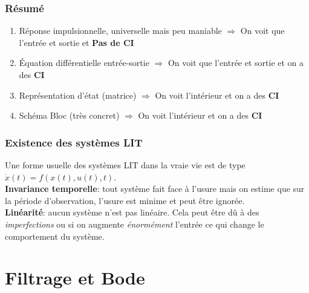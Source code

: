 \documentclass{report}
\begin{document}
\subsection{Résumé}
\begin{enumerate}
\item Réponse impulsionnelle, universelle mais peu maniable $\Rightarrow$ On voit que l'entrée et sortie et \textbf{Pas de CI}
\item Équation différentielle entrée-sortie $\Rightarrow$ On voit que l'entrée et sortie et on a des \textbf{CI}
\item Représentation d'état (matrice) $\Rightarrow$ On voit l'intérieur et on a des \textbf{CI}
\item Schéma Bloc (très concret) $\Rightarrow$ On voit l'intérieur et on a des \textbf{CI}
\end{enumerate}

\subsection{Existence des systèmes LIT}
Une forme usuelle des systèmes LIT dans la vraie vie est de type $\dot{x}(t) = f(x(t), u(t), t)$.\\
\textbf{Invariance temporelle}: tout système fait face à l'usure mais on estime que sur la période d'observation, l'usure est minime et peut être ignorée.\\
\textbf{Linéarité}: aucun système n'est pas linéaire. Cela peut être dû à des \textit{imperfections} ou si on augmente \textit{énormément} l'entrée ce qui change le comportement du système.\\

\chapter{Filtrage et Bode}
\end{document}
